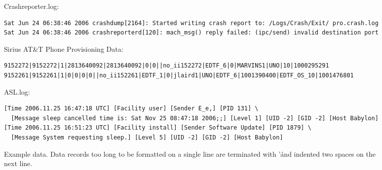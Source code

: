 \begin{figure*}
Crashreporter.log:
{\small \begin{verbatim}
Sat Jun 24 06:38:46 2006 crashdump[2164]: Started writing crash report to: /Logs/Crash/Exit/ pro.crash.log
Sat Jun 24 06:38:46 2006 crashreporterd[120]: mach_msg() reply failed: (ipc/send) invalid destination port
\end{verbatim}
}

Sirius AT\&T Phone Provisioning Data:
{\small \begin{verbatim}
9152272|9152272|1|2813640092|2813640092|0|0||no_ii152272|EDTF_6|0|MARVINS1|UNO|10|1000295291
9152261|9152261|1|0|0|0|0||no_ii152261|EDTF_1|0|jlaird1|UNO|EDTF_6|1001390400|EDTF_OS_10|1001476801
\end{verbatim}
}

ASL.log:
{\small  \begin{verbatim}
[Time 2006.11.25 16:47:18 UTC] [Facility user] [Sender E_e,] [PID 131] \
  [Message sleep cancelled time is: Sat Nov 25 08:47:18 2006;;] [Level 1] [UID -2] [GID -2] [Host Babylon]
[Time 2006.11.25 16:51:23 UTC] [Facility install] [Sender Software Update] [PID 1879] \
  [Message System requesting sleep.] [Level 5] [UID -2] [GID -2] [Host Babylon]
\end{verbatim}
}


\caption {Example data. 
Data records too long to be formatted on a single line are terminated with '\' and indented two spaces on the next line.}
\label{fig:example data}
\end{figure*}

